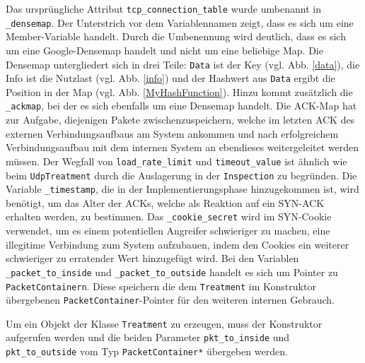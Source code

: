 \documentclass[../review_3.tex]{subfiles}
\begin{document}
Das ursprüngliche Attribut \texttt{tcp\_connection\_table} wurde umbenannt in \texttt{\_densemap}. Der Unterstrich vor dem Variablennamen zeigt, dass es sich um eine Member-Variable handelt. Durch die Umbenennung wird deutlich, dass es sich um eine Google-Densemap handelt und nicht um eine beliebige Map. Die Densemap untergliedert sich in drei Teile: \texttt{Data} ist der Key (vgl. Abb. \ref{data}), die Info ist die Nutzlast (vgl. Abb. \ref{info})  und der Hashwert aus \texttt{Data} ergibt die Position in der Map (vgl. Abb. \ref{MyHashFunction}).
Hinzu kommt zusätzlich die \texttt{\_ackmap}, bei der es sich ebenfalls um eine Densemap handelt. Die ACK-Map hat zur Aufgabe, diejenigen Pakete zwischenzuspeichern, welche im letzten ACK des externen Verbindungsaufbaus am System ankommen und nach erfolgreichem Verbindungsaufbau mit dem internen System an ebendieses weitergeleitet werden müssen.
Der Wegfall von \texttt{load\_rate\_limit} und \texttt{timeout\_value} ist ähnlich wie beim \texttt{UdpTreatment} durch die Auslagerung in der \texttt{Inspection} zu begründen.
Die Variable \texttt{\_timestamp}, die in der Implementierungsphase hinzugekommen ist, wird benötigt, um das Alter der ACKs, welche als Reaktion auf ein SYN-ACK erhalten werden, zu bestimmen.
Das \texttt{\_cookie\_secret} wird im SYN-Cookie verwendet, um es einem potentiellen Angreifer schwieriger zu machen, eine illegitime Verbindung zum System aufzubauen, indem den Cookies ein weiterer schwieriger zu erratender Wert hinzugefügt wird.
Bei den Variablen \texttt{\_packet\_to\_inside} und \texttt{\_packet\_to\_outside} handelt es sich um Pointer zu \texttt{PacketContainern}. Diese speichern die dem \texttt{Treatment} im Konstruktor übergebenen \texttt{PacketContainer}-Pointer für den weiteren internen Gebrauch.

Um ein Objekt der Klasse \texttt{Treatment} zu erzeugen, muss der Konstruktor aufgerufen werden und die beiden Parameter \texttt{pkt\_to\_inside} und \texttt{pkt\_to\_outside} vom Typ \texttt{PacketContainer*} übergeben werden.
\end{document}
